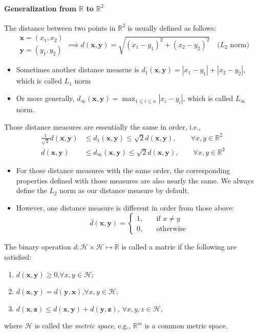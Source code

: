 \paragraph{Generalization from $\mathbb{R}$ to $\mathbb{R}^2$}The distance between two points in $\mathbb{R}^2$ is usually defined as follows:
\[
\begin{array}{l}
\bm x=(x_1,x_2)\\
\bm y=(y_1,y_2)
\end{array}\implies
d(\bm x,\bm y)=\sqrt{(x_1-y_1)^2+(x_2-y_2)^2}\quad\mbox{($L_2$ norm)}
\]
\begin{itemize}
\item
Sometimes another distance measrue is $d_1(\bm x,\bm y)=|x_1-y_1|+|x_2-y_2|$, which is called $L_1$ norm
\item
Or more generally, $d_{\infty}(\bm x,\bm y)=\max_{1\le i\le n}|x_i-y_i|$, which is called $L_{\infty}$ norm.
\end{itemize}
Those distance measures are essentially the same in order, i.e.,
\begin{align*}
\frac{1}{\sqrt{2}}d(\bm x,\bm y)&\le d_1(\bm x,\bm y)\le\sqrt{2}d(\bm x,\bm y),\qquad \forall x,y\in\mathbb{R}^2\\
d(\bm x,\bm y)&\le d_{\infty}(\bm x,\bm y)\le\sqrt{2}d(\bm x,\bm y),\qquad \forall x,y\in\mathbb{R}^2
\end{align*}
\begin{remark}
\begin{itemize}
\item
For those distance measures with the same order, the corresponding properties defined with those measures are also nearly the same. We always define the $L_2$ norm as our distance measure by default.
\item
However, one distance measure is different in order from those above: 
\[
\bar{d}(\bm x,\bm y)=\left\{
\begin{aligned}
1,&\quad\mbox{if }x\ne y\\
0,&\quad\mbox{otherwise}
\end{aligned}
\right.
\]
\end{itemize}
\end{remark}
\begin{definition}
The binary operation $d:\mathcal{H}\times\mathcal{H}\mapsto\mathbb{R}$ is called a matric if the following are satisfied:
\begin{enumerate}
\item
$d(\bm x,\bm y)\ge0$,$\forall x,y\in\mathcal{H}$;
\item
$d(\bm x,\bm y)=d(\bm y,\bm x)$,$\forall x,y\in\mathcal{H}$;
\item
$d(\bm x,\bm z)\le d(\bm x,\bm y)+d(\bm y,\bm z)$, $\forall x,y,z\in\mathcal{H}$,
\end{enumerate}
where $\mathcal{H}$ is called the \emph{metric space}, e.g., $\mathbb{R}^m$ is a common metric space.
\end{definition}
